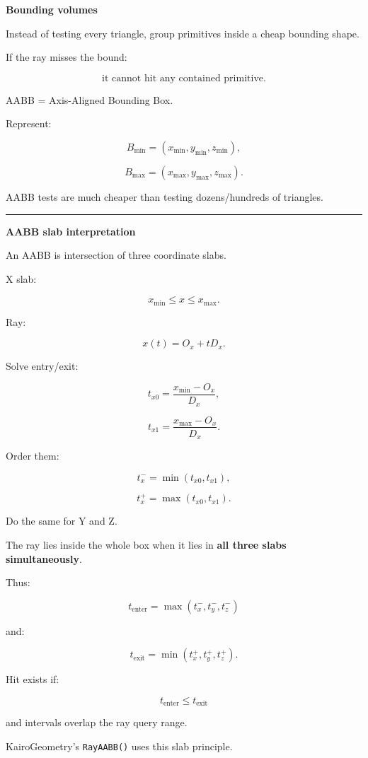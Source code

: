\textbf{Bounding volumes}

Instead of testing every triangle, group primitives inside a cheap bounding shape.

If the ray misses the bound:

\[
\boxed{
\text{it cannot hit any contained primitive}.
}
\]

AABB = Axis-Aligned Bounding Box.

Represent:

\[
B_{\min}
=
(x_{\min},y_{\min},z_{\min}),
\]

\[
B_{\max}
=
(x_{\max},y_{\max},z_{\max}).
\]

AABB tests are much cheaper than testing dozens/hundreds of triangles.

\begin{center}\rule{0.5\linewidth}{0.5pt}\end{center}

\textbf{AABB slab interpretation}

An AABB is intersection of three coordinate slabs.

X slab:

\[
x_{\min}\le x\le x_{\max}.
\]

Ray:

\[
x(t)=O_x+tD_x.
\]

Solve entry/exit:

\[
t_{x0}
=
\frac{x_{\min}-O_x}{D_x},
\]

\[
t_{x1}
=
\frac{x_{\max}-O_x}{D_x}.
\]

Order them:

\[
t_x^-=\min(t_{x0},t_{x1}),
\]

\[
t_x^+=\max(t_{x0},t_{x1}).
\]

Do the same for Y and Z.

The ray lies inside the whole box when it lies in \textbf{all three slabs simultaneously}.

Thus:

\[
\boxed{
t_{\text{enter}}
=
\max(
t_x^-,
t_y^-,
t_z^-
)
}
\]

and:

\[
\boxed{
t_{\text{exit}}
=
\min(
t_x^+,
t_y^+,
t_z^+
).
}
\]

Hit exists if:

\[
\boxed{
t_{\text{enter}}
\le
t_{\text{exit}}
}
\]

and intervals overlap the ray query range.

KairoGeometry's \texttt{RayAABB()} uses this slab principle.

